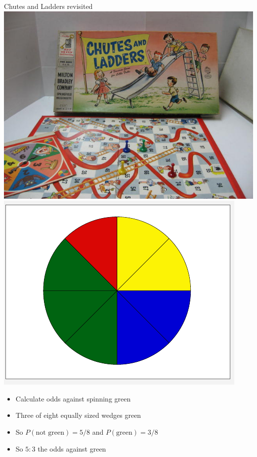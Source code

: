 \documentclass{beamer}
\theoremstyle{definition}
\begin{document}
\begin{frame}{Chutes and Ladders revisited}
\includegraphics[scale=.22]{ChutesAndLadders}
\includegraphics[scale=.30]{Spinner}
\begin{itemize}
\item Calculate odds against spinning green
\item Three of eight equally sized wedges green
\item So $P\left(\text{not green}\right)=5/8$
and $P\left(\text{green}\right)=3/8$
\item So $5:3$ the odds against green
\end{itemize}
\end{frame}
\end{document}
